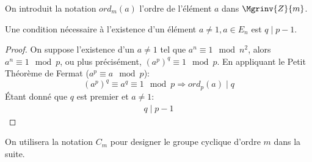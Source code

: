 		On introduit la notation $ord_m(a)$ l'ordre de l'élément $a$ dans $\Mgrinv{Z}{m}$.
		\begin{lemma}{Une condition nécessaire à l'existence d'un élément $a \neq 1, a \in E_n$ est $q \mid p-1$.}
		\label{aneq1:necessaire}
		\begin{proof}
			On suppose l'existence d'un $a \neq 1$ tel que $a^n \equiv 1 \mod{n^2}$, alors $a^n\equiv1\mod{p}$, ou plus précisément, $(a^p)^q \equiv 1\mod{p}$.
			En appliquant le Petit Théorème de Fermat ($a^p \equiv a \mod{p}$):
			\begin{equation*}
				(a^p)^q \equiv a^q \equiv 1\mod{p} \Rightarrow ord_p(a) \mid q
			\end{equation*}
				Étant donné que $q$ est premier et $a \neq 1$:
			\begin{align}
				q \mid p-1 %
			\end{align}
				
		\end{proof}
		\end{lemma}
		On utilisera la notation $C_m$ pour designer le groupe cyclique d'ordre $m$ dans la suite.

